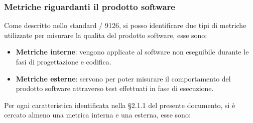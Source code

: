     \subsubsection{Metriche riguardanti il prodotto software}
    Come descritto nello standard / 9126, si posso identificare due tipi di metriche utilizzate per misurare la qualita del prodotto software, esse sono:
    \begin{itemize}
      \item \textbf{Metriche interne}: vengono applicate al software non eseguibile durante le fasi di progettazione e codifica.
      \item \textbf{Metriche esterne}: servono per poter misurare il comportamento del prodotto software attraverso test effettuati in fase di esecuzione.
    \end{itemize}
    Per ogni caratteristica identificata nella \S2.1.1 del presente documento, si è cercato almeno una metrica interna e una esterna, esse sono:
